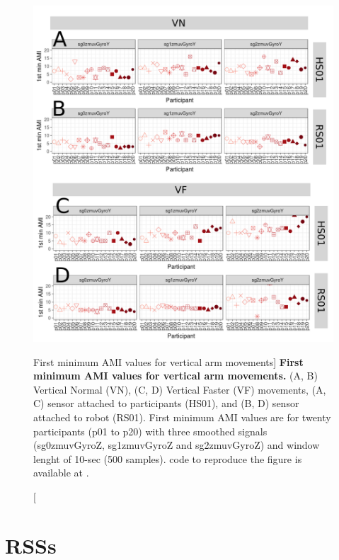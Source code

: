 \begin{figure}
\centering
\includegraphics[width=1.0\textwidth]{ami_aVw10}
	\caption
	[First minimum AMI values for vertical arm movements]{
	{\bf First minimum AMI values for vertical arm movements.}
		(A, B) Vertical Normal (VN), (C, D) Vertical Faster (VF) 
		movements,
		(A, C) sensor attached to participants (HS01), and
		(B, D) sensor attached to robot (RS01).
		First minimum AMI values are for twenty participants 
		(p01 to p20) with three smoothed signals (sg0zmuvGyroZ, 
		sg1zmuvGyroZ and sg2zmuvGyroZ) and  window lenght of 
		10-sec (500 samples).
	\R code to reproduce the figure is available at 
	.
        }
    \label{fig:amiV}
\end{figure}




\newpage
\section{RSSs} \label{appendix:f:rsss}

